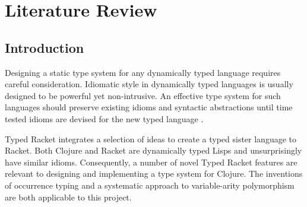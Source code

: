 
\chapter{Literature Review}


\section{Introduction}

Designing a static type system for any dynamically typed language requires
careful consideration. Idiomatic style in dynamically typed languages is usually
designed to be powerful yet non-intrusive. An effective type system
for such languages should preserve existing idioms and syntactic abstractions
until time tested idioms are devised for the new typed language \cite{SAMTH:dissertation}.

Typed Racket \cite{SAMTH:dissertation} integrates a selection of ideas to
create a typed sister language to Racket.
Both Clojure and Racket are dynamically typed Lisps and unsurprisingly have similar idioms. 
Consequently, a number of novel Typed Racket features are relevant to designing and implementing 
a type system for Clojure.
The inventions of occurrence typing \cite{Tobin-Hochstadt:2010:LTU:1932681.1863561}
and a systematic approach to variable-arity polymorphism
\cite{Strickland:2009:PVP:1532974.1532978}
are both applicable to this project.

